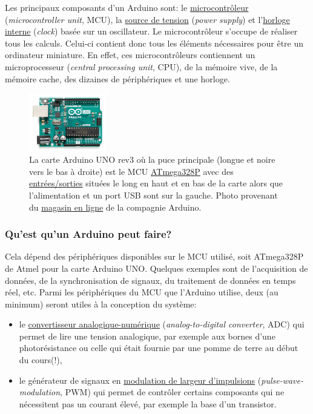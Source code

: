 \documentclass[english,french,12pt]{article}
\begin{document}
Les principaux composants d’un Arduino sont: le \href{https://en.wikipedia.org/wiki/Microcontroller}{microcontrôleur} (\textit{microcontroller unit}, MCU), la \href{https://electronics.stackexchange.com/questions/26484/how-arduino-power-supply-works}{source de tension} (\textit{power supply}) et l’\href{https://en.wikipedia.org/wiki/Clock_signal}{horloge interne} (\textit{clock}) basée sur un oscillateur. Le microcontrôleur s’occupe de réaliser tous les calculs. Celui-ci contient donc tous les éléments nécessaires pour être un ordinateur miniature. En effet, ces microcontrôleurs contiennent un microprocesseur (\textit{central processing unit}, CPU), de la mémoire vive, de la mémoire cache, des dizaines de périphériques et une horloge.

\begin{figure}[h]
    \centering
    \includegraphics[width=0.3\textwidth]{Projets de conception/ArduinoUNO.jpg}
    \caption{La carte Arduino UNO rev3 où la puce principale (longue et noire vers le bas à droite) est le MCU \href{http://ww1.microchip.com/downloads/en/DeviceDoc/Atmel-7810-Automotive-Microcontrollers-ATmega328P_Datasheet.pdf}{ATmega328P} avec des \href{https://www.circuito.io/blog/arduino-uno-pinout/}{ entrées/sorties} situées le long en haut et en bas de la carte alors que l'alimentation et un port USB sont sur la gauche. Photo provenant du \href{https://store.arduino.cc/usa/}{magasin en ligne} de la compagnie Arduino.}
    \label{fig:ArduinoUNO}
\end{figure}

\subsubsection*{Qu'est qu'un Arduino peut faire?}
Cela dépend des périphériques disponibles sur le MCU utilisé, soit ATmega328P de Atmel pour la carte Arduino UNO. Quelques exemples sont de l’acquisition de données, de la synchronisation de signaux, du traitement de données en temps réel, etc. Parmi les périphériques du MCU que l’Arduino utilise, deux (au minimum) seront utiles à la conception du système:
\begin{itemize}
    \item le \href{https://en.wikipedia.org/wiki/Analog-to-digital_converter}{convertisseur analogique-numérique} (\textit{analog-to-digital converter}, ADC) qui permet de lire une tension analogique, par exemple aux bornes d’une photorésistance ou celle qui était fournie par une pomme de terre au début du cours(!),
    \item le générateur de signaux en   \href{https://en.wikipedia.org/wiki/Pulse-width_modulation}{modulation de largeur d'impulsions} (\textit{pulse-wave-modulation}, PWM) qui permet de contrôler certains composants qui ne nécessitent pas un courant élevé, par exemple la base d’un transistor.
\end{itemize}
\end{document}
